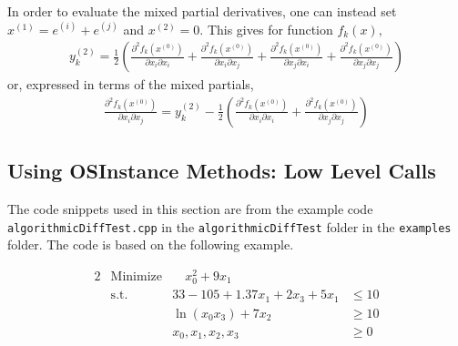 \documentclass[11pt]{article}
\newcommand{\DD}[3]{ \frac{\partial^2 #1}{\partial #2 \partial #3} }
\renewcommand{\_}{{\char"5F}}
\renewcommand{\{}{{\char"7B}}
\renewcommand{\}}{{\char"7D}}
\renewcommand{\^}{{\char"0D}}
\renewcommand{\'}{{\char"0D}}
\begin{document}
In order to evaluate the mixed partial derivatives, one can instead set $x^{(1)} = e^{(i)} + e^{(j)}$ and $x^{(2)} = 0.$    This gives for function $f_{k}(x),$
\begin{eqnarray}
y^{(2)}_{k} =  \frac{1}{2} \left( \DD{f_{k}(x^{(0)})}{x_{i}}{x_{i}}  +   \DD{f_{k}(x^{(0)})}{x_{i}}{x_{j}} +  \DD{f_{k}(x^{(0)})}{x_{j}}{x_{i}} +  \DD{f_{k}(x^{(0)})}{x_{j}}{x_{j}}  \right) \label{eq:forward2Resultb}
\end{eqnarray}
or, expressed in terms of the mixed partials,
\begin{eqnarray}
  \DD{f_{k}(x^{(0)})}{x_{i}}{x_{j}}  = y_{k}^{(2)}  -  \frac{1}{2} \left( \DD{f_{k}(x^{(0)})}{x_{i}}{x_{i}}  +  \DD{f_{k}(x^{(0)})}{x_{j}}{x_{j}}  \right) \label{eq:forward2Resultc}
\end{eqnarray}





\subsection{Using OSInstance Methods: Low Level Calls}\label{section:lowlevelADcalls}

  The code snippets used in this section  are from the example code {\tt algorithmicDiffTest.cpp} in the {\tt algorithmicDiffTest} folder in the {\tt examples} folder.  The  code is based on the following example.

\begin{alignat}{2}
& \mbox{Minimize} & \quad  x_{0}^{2} + 9x_{1} \label{eq:adobj}\\
& \mbox{s.t.} & 33 - 105 + 1.37 x_{1} + 2x_{3} + 5 x_{1} &\le 10  \label{eq:adeq0}\\
& & \ln(x_{0} x_{3}) + 7x_{2} &\ge 10 \label{eq:adeq1} \\
& & x_{0}, x_{1}, x_{2}, x_{3} &\ge 0 \label{eq:adeq2}
\end{alignat}
\end{document}
